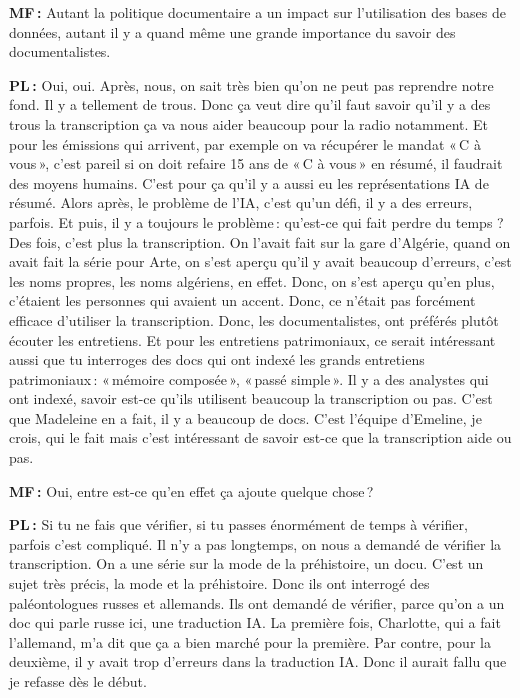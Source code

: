 \textbf{MF :} Autant la politique documentaire a un impact sur l'utilisation des bases de données, autant il y a quand même une grande importance du savoir des documentalistes.  

\textbf{PL :} Oui, oui.  Après, nous, on sait très bien qu'on ne peut pas reprendre notre fond.  Il y a tellement de trous. Donc ça veut dire qu'il faut savoir qu'il y a des trous la transcription ça va nous aider beaucoup pour la radio notamment. Et pour les émissions qui arrivent, par exemple on va récupérer le mandat « C à vous », c'est pareil si on doit refaire 15 ans de « C à vous » en résumé, il faudrait des moyens humains. C'est pour ça qu'il y a aussi eu les représentations IA de résumé. Alors après, le problème de l'IA, c'est qu'un défi, il y a des erreurs, parfois.  Et puis, il y a toujours le problème : qu'est-ce qui fait perdre du temps ? Des fois, c'est plus la transcription.  On l'avait fait sur la gare d'Algérie, quand on avait fait la série pour Arte, on s'est aperçu qu'il y avait beaucoup d'erreurs, c'est les noms propres, les noms algériens, en effet.  Donc, on s'est aperçu qu'en plus, c’étaient les personnes qui avaient un accent.  Donc, ce n'était pas forcément efficace d'utiliser la transcription. Donc, les documentalistes, ont préférés plutôt écouter les entretiens. Et pour les entretiens patrimoniaux, ce serait intéressant aussi que tu interroges des docs qui ont indexé les grands entretiens patrimoniaux : « mémoire composée », « passé simple ». Il y a des analystes qui ont indexé, savoir est-ce qu'ils utilisent beaucoup la transcription ou pas. C'est que Madeleine en a fait, il y a beaucoup de docs. C'est l'équipe d'Emeline, je crois, qui le fait mais c'est intéressant de savoir est-ce que la transcription aide ou pas. 

\textbf{MF :} Oui, entre est-ce qu'en effet ça ajoute quelque chose ?  

\textbf{PL :} Si tu ne fais que vérifier, si tu passes énormément de temps à vérifier, parfois c'est compliqué. Il n'y a pas longtemps, on nous a demandé de vérifier la transcription.  On a une série sur la mode de la préhistoire, un docu. C'est un sujet très précis, la mode et la préhistoire.  Donc ils ont interrogé des paléontologues russes et allemands. Ils ont demandé de vérifier, parce qu'on a un doc qui parle russe ici, une traduction IA. La première fois, Charlotte, qui a fait l'allemand, m'a dit que ça a bien marché pour la première.  Par contre, pour la deuxième, il y avait trop d'erreurs dans la traduction IA. Donc il aurait fallu que je refasse dès le début. 

